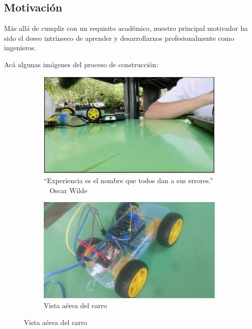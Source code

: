 \subsection{Motivación}
Más allá de cumplir con un requisito académico, nuestro principal motivador ha sido el deseo intrínseco de aprender y desarrollarnos profesionalmente como ingenieros.

Acá algunas imágenes del proceso de construcción:

\begin{figure}[H]
    \centering
    \begin{subfigure}[b]{0.7\textwidth}
        \centering
        \includegraphics[width=\textwidth]{Figures/0. General/robot_screen.png}
        \caption{``Experiencia es el nombre que todos dan a sus errores.'' ~ Oscar Wilde}
    \end{subfigure}
    \begin{subfigure}[b]{0.6\textwidth}
        \centering
        \includegraphics[width=\textwidth]{Figures/0. General/car_controller_2.jpeg}
        \caption{Vista aérea del carro}
    \end{subfigure}

\end{figure}
